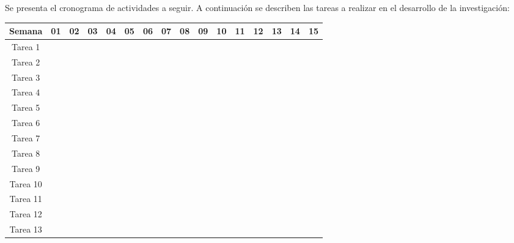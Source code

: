
Se presenta el cronograma de actividades a seguir. A continuación se describen las tareas a realizar en el desarrollo de la investigación:
\begin{center}
\begin{footnotesize}
\begingroup
\setlength{\tabcolsep}{8pt} %
\renewcommand{\arraystretch}{1.3} %
\begin{tabular}{|c|c|c|c|c|c|c|c|c|c|c|c|c|c|c|c|}
\hline
\textbf{Semana} & \textbf{01} & \textbf{02} & \textbf{03} & \textbf{04} & \textbf{05} & \textbf{06} & \textbf{07} & \textbf{08} & \textbf{09} & \textbf{10} & \textbf{11} & \textbf{12} & \textbf{13} & \textbf{14} & \textbf{15} \\ \hline
Tarea 1 & \cellcolor{gray}	&	&	&	&	&	&	&	&	&	&	&	&	&	& 	\\ \hline
Tarea 2 &	& \cellcolor{gray} & \cellcolor{gray} & \cellcolor{gray} &	&	&	&	&	&	&	&	&	&	&	\\ \hline
Tarea 3 &	&	&	& 	& \cellcolor{gray}	&	&	&	&	&	&	&	&	&	&	\\ \hline
Tarea 4 &	&	&	&	&	& \cellcolor{gray}	&	&	&	&	&	&	&	&	&	\\ \hline
Tarea 5 &	&	&	&	& \cellcolor{gray}	& \cellcolor{gray}	& \cellcolor{gray}	&	&	&	&	&	&	&	&	\\ \hline
Tarea 6 &	&	&	&	&	&	&	& \cellcolor{gray}	& 	&	&	&	&	&	&	\\ \hline
Tarea 7 &	&	&	&	&	&	&	&	& \cellcolor{gray}	& 	&	&	&	&	&	\\ \hline
Tarea 8 &	&	&	&	&	&	&	& \cellcolor{gray}	& \cellcolor{gray}	& \cellcolor{gray}	& 	&	&	&	&	\\ \hline
Tarea 9 & 	&	&	&	&	&	&	&	&	&	& \cellcolor{gray}	&  	&	&	& 	\\ \hline
Tarea 10 & 	&	&	&	&	&	&	&	&	&	&	& \cellcolor{gray}	&	&	& 	\\ \hline
Tarea 11 & 	&	&	&	&	&	&	&	&	&	&	& \cellcolor{gray}	& \cellcolor{gray}	&	& 	\\ \hline
Tarea 12 & 	&	&	&	&	&	&	&	&	&	&	&	& \cellcolor{gray}	& \cellcolor{gray}	& 	\\ \hline
Tarea 13 & 	&	&	&	&	&	&	&	&	& \cellcolor{gray}	& \cellcolor{gray}	& \cellcolor{gray}	& \cellcolor{gray}	& \cellcolor{gray}	& \cellcolor{gray} 	\\ \hline
\end{tabular}
\endgroup
\end{footnotesize}
\end{center}

